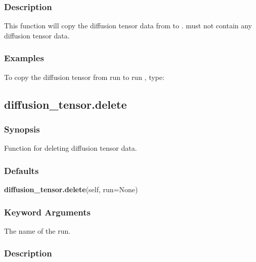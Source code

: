   

  
 \subsubsection{Description} 

 This function will copy the diffusion tensor data from  to .   must not contain any diffusion tensor data. 
  

  
 \subsubsection{Examples} 

 To copy the diffusion tensor from run  to run , type: 
  


  

 \newpage 

 \subsection{diffusion\_tensor.delete} 

  
 \subsubsection{Synopsis} 

 Function for deleting diffusion tensor data. 
  

  
 \subsubsection{Defaults} 

 \textsf{\textbf{diffusion\_tensor.delete}(self, run=None)} 

  
 \subsubsection{Keyword Arguments} 

   The name of the run.  

  

  
 \subsubsection{Description} 

